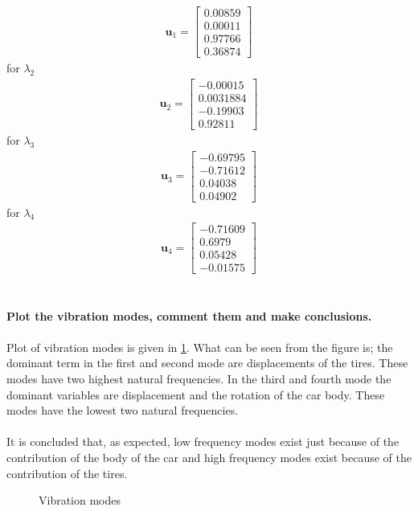\documentclass[]{report}
\begin{document}
\begin{align*}
\mathbf{u}_1=\left[\begin{array}{cccc} 0.00859  \\ 0.00011  \\ 0.97766  \\ 0.36874 \end{array}\right]
\end{align*}
for $\lambda_2$
\begin{align*}
\mathbf{u}_2=\left[\begin{array}{cccc} -0.00015  \\ 0.0031884  \\ -0.19903  \\ 0.92811 \end{array}\right]
\end{align*}
for $\lambda_3$
\begin{align*}
\mathbf{u}_3=\left[\begin{array}{cccc} -0.69795  \\ -0.71612 \\ 0.04038  \\ 0.04902\end{array}\right]
\end{align*}
for $\lambda_4$
\begin{align*}
\mathbf{u}_4=\left[\begin{array}{cccc} -0.71609 \\ 0.6979  \\ 0.05428  \\ -0.01575 \end{array}\right]
\end{align*}
\\~\\
\textbf{Plot the vibration modes, comment them and make conclusions.}
\\~\\
Plot of vibration modes is given in \cref{fig:allmodes}. What can be seen from the figure is; the dominant term in the first and second mode are displacements of the tires. These modes have two highest natural frequencies. In the third and fourth mode the dominant variables are displacement and the rotation of the car body. These modes have the lowest two natural frequencies.
\\~\\
It is concluded that, as expected, low frequency modes exist just because of the contribution of the body of the car and high frequency modes exist because of the contribution of the tires.
\begin{figure}[h!]
\centering

\caption{Vibration modes}
\label{fig:allmodes}
\end{figure}
\end{document}

